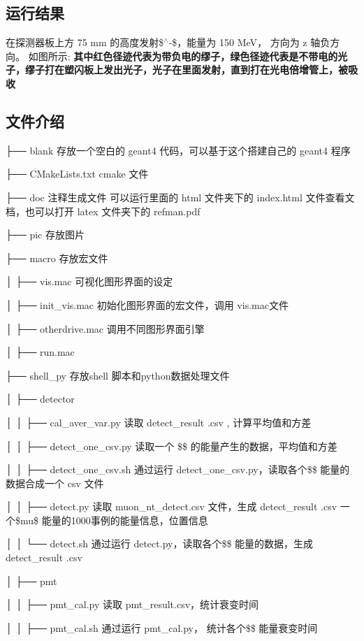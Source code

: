 \subsection*{运行结果}

在探测器板上方 75 mm 的高度发射\$$^\wedge$-\/\$，能量为 150 Me\+V， 方向为 z 轴负方向。 如图所示\+:   {\bfseries 其中红色径迹代表为带负电的缪子，绿色径迹代表是不带电的光子，缪子打在塑闪板上发出光子，光子在里面发射，直到打在光电倍增管上，被吸收}

\subsection*{文件介绍}

├── blank 存放一个空白的 geant4 代码，可以基于这个搭建自己的 geant4 程序

├── C\+Make\+Lists.\+txt cmake 文件

├── doc 注释生成文件 可以运行里面的 html 文件夹下的 index.\+html 文件查看文档，也可以打开 latex 文件夹下的 refman.\+pdf

├── pic 存放图片

├── macro 存放宏文件

│ ├── vis.\+mac 可视化图形界面的设定

│ ├── init\+\_\+vis.\+mac 初始化图形界面的宏文件，调用 vis.\+mac文件

│ ├── otherdrive.\+mac 调用不同图形界面引擎

│ ├── run.\+mac

├── shell\+\_\+py 存放shell 脚本和python数据处理文件

│ ├── detector

│ │ ├── cal\+\_\+aver\+\_\+var.\+py 读取 detect\+\_\+result .csv , 计算平均值和方差

│ │ ├── detect\+\_\+one\+\_\+csv.\+py 读取一个 \$\$ 的能量产生的数据，平均值和方差

│ │ ├── detect\+\_\+one\+\_\+csv.\+sh 通过运行 detect\+\_\+one\+\_\+csv.\+py，读取各个\$\$ 能量的数据合成一个 csv 文件

│ │ ├── detect.\+py 读取 muon\+\_\+nt\+\_\+detect.\+csv 文件，生成 detect\+\_\+result .csv 一个\$mu\$ 能量的1000事例的能量信息，位置信息

│ │ └── detect.\+sh 通过运行 detect.\+py，读取各个\$\$ 能量的数据，生成 detect\+\_\+result .csv

│ ├── pmt

│ │ ├── pmt\+\_\+cal.\+py 读取 pmt\+\_\+result.\+csv，统计衰变时间

│ │ ├── pmt\+\_\+cal.\+sh 通过运行 pmt\+\_\+cal.\+py， 统计各个\$\$ 能量衰变时间

